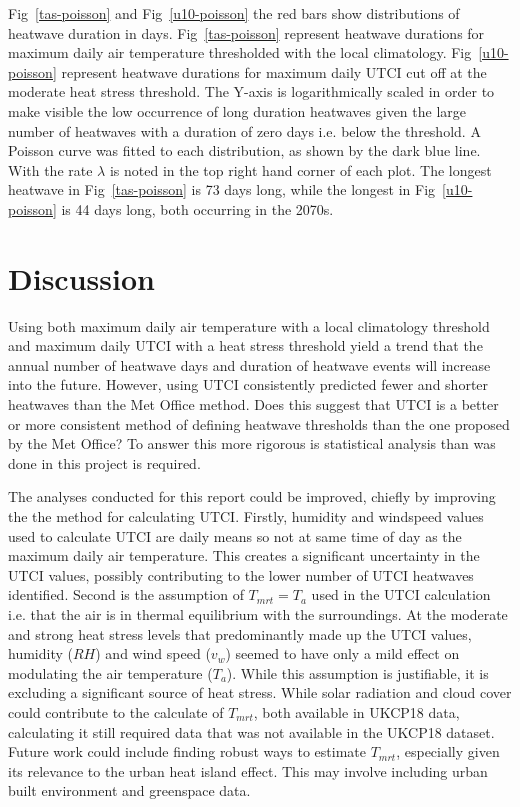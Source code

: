 \documentclass[10pt,letterpaper]{article}
\begin{document}
Fig~\ref{tas-poisson} and Fig~\ref{u10-poisson} the red bars show distributions of heatwave duration in days.
Fig~\ref{tas-poisson} represent heatwave durations for maximum daily air temperature thresholded with the local climatology.
Fig~\ref{u10-poisson} represent heatwave durations for maximum daily UTCI cut off at the moderate heat stress threshold.
The Y-axis is logarithmically scaled in order to make visible the low occurrence of long duration heatwaves given the large number of heatwaves with a duration of zero days i.e. below the threshold.
A Poisson curve was fitted to each distribution, as shown by the dark blue line.
With the rate $\lambda$ is noted in the top right hand corner of each plot.
The longest heatwave in Fig~\ref{tas-poisson} is 73 days long, while the longest in Fig~\ref{u10-poisson} is 44 days long, both occurring in the 2070s.



\section*{Discussion}

Using both maximum daily air temperature with a local climatology threshold and maximum daily UTCI with a heat stress threshold yield a trend that the annual number of heatwave days and duration of heatwave events will increase into the future. 
However, using UTCI consistently predicted fewer and shorter heatwaves than the Met Office method. Does this suggest that UTCI is a better or more consistent method of defining heatwave thresholds than the one proposed by the Met Office? To answer this more rigorous is statistical analysis than was done in this project is required.

The analyses conducted for this report could be improved, chiefly by improving the the method for calculating UTCI.
Firstly, humidity and windspeed values used to calculate UTCI are daily means so not at same time of day as the maximum daily air temperature.
This creates a significant uncertainty in the UTCI values, possibly contributing to the lower number of UTCI heatwaves identified.
Second is the assumption of $T_{mrt}=T_a$ used in the UTCI calculation i.e. that the air is in thermal equilibrium with the surroundings.
At the moderate and strong heat stress levels that predominantly made up the UTCI values, humidity ($RH$) and wind speed ($v_w$) seemed to have only a mild effect on modulating the air temperature ($T_a$).
While this assumption is justifiable, it is excluding a significant source of heat stress.
While solar radiation and cloud cover could contribute to the calculate of $T_{mrt}$, both available in UKCP18 data, calculating it still required data that was not available in the UKCP18 dataset.\cite{Weihs2018}
Future work could include finding robust ways to estimate $T_{mrt}$, especially given its relevance to the urban heat island effect.
This may involve including urban built environment and greenspace data.
\end{document}
